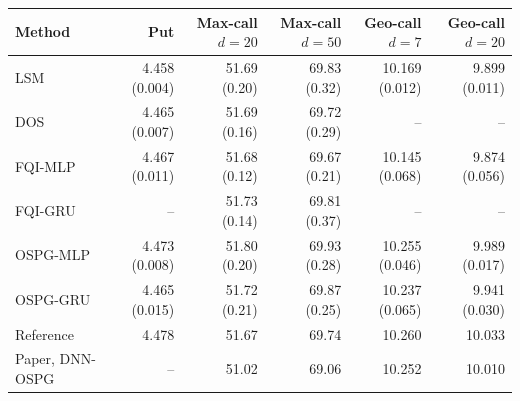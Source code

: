 \begin{tabular}{lrrrrr}
\toprule
Method & Put & Max-call $d{=}20$ & Max-call $d{=}50$ & Geo-call $d{=}7$ & Geo-call $d{=}20$ \\
\midrule
LSM & 4.458 (0.004) & 51.69 (0.20) & 69.83 (0.32) & 10.169 (0.012) & 9.899 (0.011) \\
DOS & 4.465 (0.007) & 51.69 (0.16) & 69.72 (0.29) & -- & -- \\
FQI-MLP & 4.467 (0.011) & 51.68 (0.12) & 69.67 (0.21) & 10.145 (0.068) & 9.874 (0.056) \\
FQI-GRU & -- & 51.73 (0.14) & 69.81 (0.37) & -- & -- \\
OSPG-MLP & 4.473 (0.008) & 51.80 (0.20) & 69.93 (0.28) & 10.255 (0.046) & 9.989 (0.017) \\
OSPG-GRU & 4.465 (0.015) & 51.72 (0.21) & 69.87 (0.25) & 10.237 (0.065) & 9.941 (0.030) \\
\midrule
Reference & 4.478 & 51.67 & 69.74 & 10.260 & 10.033 \\
Paper, DNN-OSPG & -- & 51.02 & 69.06 & 10.252 & 10.010 \\
\bottomrule
\end{tabular}
